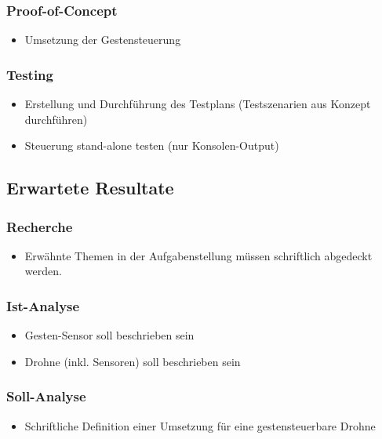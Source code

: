 \subsubsection{Proof-of-Concept}
\begin{itemize}
	\item Umsetzung der Gestensteuerung
\end{itemize}


\subsubsection{Testing}
\begin{itemize}
	\item Erstellung und Durchführung des Testplans (Testszenarien aus Konzept durchführen)
	\item Steuerung stand-alone testen (nur Konsolen-Output)
\end{itemize}

\subsection{Erwartete Resultate}
\subsubsection{Recherche}
\begin{itemize}
	\item Erwähnte Themen in der Aufgabenstellung müssen schriftlich abgedeckt werden.
\end{itemize}

\subsubsection{Ist-Analyse}
\begin{itemize}
	\item Gesten-Sensor soll beschrieben sein
	\item Drohne (inkl. Sensoren) soll beschrieben sein
\end{itemize}

\subsubsection{Soll-Analyse}
\begin{itemize}
	\item Schriftliche Definition einer Umsetzung für eine gestensteuerbare Drohne
\end{itemize}

